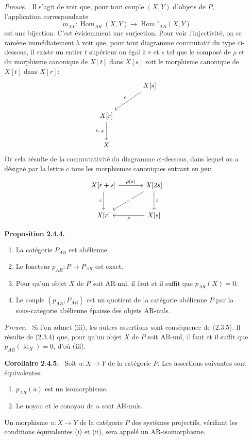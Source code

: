 \documentclass[11pt]{article}
\newenvironment{statement}[1]{\par\medskip\noindent\textbf{#1.}\ }{\par\medskip}
\newenvironment{prooftext}[1][Proof]{\par\noindent\emph{#1.}\ }{\par\medskip}
\DeclareMathOperator{\Hom}{Hom}
\providecommand{\id}{\operatorname{id}}
\providecommand{\Hom}{\operatorname{Hom}}
\providecommand{\id}{\operatorname{id}}
\providecommand{\id}{\operatorname{id}}
\providecommand{\id}{\operatorname{id}}
\providecommand{\id}{\operatorname{id}}
\providecommand{\Hom}{\operatorname{Hom}}
\providecommand{\id}{\operatorname{id}}
\begin{document}
\begin{prooftext}[Preuve]
Il s'agit de voir que, pour tout couple $(X,Y)$ d'objets de $P$, l'application correspondante
\[
m_{XY}:\Hom_{AR}(X,Y)\longrightarrow\Hom'_{AR}(X,Y)
\]
est une bijection. C'est évidemment une surjection. Pour voir l'injectivité, on se ramène immédiatement à voir que, pour tout diagramme commutatif du type ci-dessous, il existe un entier $t$ supérieur ou égal à $r$ et $s$ tel que le composé de $\rho$ et du morphisme canonique de $X[t]$ dans $X[s]$ soit le morphisme canonique de $X[t]$ dans $X[r]$:
\[
\begin{tikzcd}[column sep=large,row sep=large]
& X[s] \arrow[dl,"\rho"']\\
X[r] \arrow[d,"{v_{rX}}"']\\
X
\end{tikzcd}
\]
Or cela résulte de la commutativité du diagramme ci-dessous, dans lequel on a désigné par la lettre $c$ tous les morphismes canoniques entrant en jeu:
\[
\begin{tikzcd}[column sep=large,row sep=large]
X[r+s] \arrow[r,"\rho(s)"] \arrow[d,"c"'] & X[2s] \arrow[d,"c"] \arrow[dl,"c" description]\\
X[r] & X[s] \arrow[l,"\rho"]
\end{tikzcd}
\]
\end{prooftext}

\begin{statement}{Proposition 2.4.4}
\begin{enumerate}[label=(\roman*)]
\item La catégorie $P_{AR}$ est abélienne.
\item Le foncteur $p_{AR}:P\to P_{AR}$ est exact.
\item Pour qu'un objet $X$ de $P$ soit AR-nul, il faut et il suffit que $p_{AR}(X)=0$.
\item Le couple $(p_{AR},P_{AR})$ est un quotient de la catégorie abélienne $P$ par la sous-catégorie abélienne épaisse des objets AR-nuls.
\end{enumerate}
\end{statement}

\begin{prooftext}[Preuve]
Si l'on admet (iii), les autres assertions sont conséquence de (2.3.5). Il résulte de (2.3.4) que, pour qu'un objet $X$ de $P$ soit AR-nul, il faut et il suffit que $p_{AR}(\id_X)=0$, d'où (iii).
\end{prooftext}

\begin{statement}{Corollaire 2.4.5}
Soit $u:X\to Y$ de la catégorie $P$. Les assertions suivantes sont équivalentes:
\begin{enumerate}[label=(\roman*)]
\item $p_{AR}(u)$ est un isomorphisme.
\item Le noyau et le conoyau de $u$ sont AR-nuls.
\end{enumerate}
Un morphisme $u:X\to Y$ de la catégorie $P$ des systèmes projectifs, vérifiant les conditions équivalentes (i) et (ii), sera appelé un AR-isomorphisme.
\end{statement}
\end{document}
